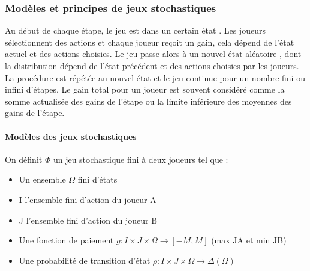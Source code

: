 \documentclass[a4paper, 12pt, twoside]{article}
\begin{document}
{{{{\subsubsection{Modèles et principes de jeux stochastiques }
Au début de chaque étape, le jeu est dans un certain état . Les joueurs sélectionnent des actions et chaque joueur reçoit un gain, cela dépend de l'état actuel et des actions choisies. Le jeu passe alors à un nouvel état aléatoire , dont la distribution dépend de l'état précédent et des actions choisies par les joueurs. La procédure est répétée au nouvel état et le jeu continue pour un nombre fini ou infini d'étapes. Le gain total pour un joueur est souvent considéré comme la somme actualisée des gains de l'étape ou la limite inférieure des moyennes des gains de l'étape.

\paragraph{Modèles des jeux stochastiques}
On définit $\Phi$ un jeu stochastique fini à deux joueurs tel que :
\begin{itemize}
\item Un ensemble $\Omega$ fini d'états
\item I l'ensemble fini d'action du joueur A
\item J l'ensemble fini d'action du joueur B
\item Une fonction de paiement $g : I \times J \times\Omega\rightarrow [ -M,M]$ (max \textsf{JA} et min \textsf{JB})
\item Une probabilité de transition d'état $\rho : I \times J \times \Omega \rightarrow \Delta (\Omega)$
\end{itemize}

}}}}
\end{document}
